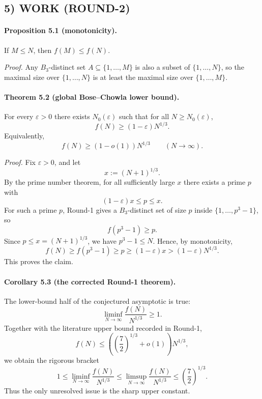 \subsection*{5) WORK (ROUND-2)}

\paragraph{Proposition 5.1 (monotonicity).}
If $M\le N$, then $f(M)\le f(N)$.

\emph{Proof.}
Any $B_3$-distinct set $A\subseteq\{1,\dots,M\}$ is also a subset of $\{1,\dots,N\}$, so the maximal size over $\{1,\dots,N\}$ is at least the maximal size over $\{1,\dots,M\}$.

\paragraph{Theorem 5.2 (global Bose--Chowla lower bound).}
For every $\varepsilon>0$ there exists $N_0(\varepsilon)$ such that for all $N\ge N_0(\varepsilon)$,
\[
 f(N)\ge (1-\varepsilon)N^{1/3}.
\]
Equivalently,
\[
 f(N)\ge (1-o(1))N^{1/3}
 \qquad (N\to\infty).
\]

\emph{Proof.}
Fix $\varepsilon>0$, and let
\[
 x:=(N+1)^{1/3}.
\]
By the prime number theorem, for all sufficiently large $x$ there exists a prime $p$ with
\[
 (1-\varepsilon)x\le p\le x.
\]
For such a prime $p$, Round-1 gives a $B_3$-distinct set of size $p$ inside $\{1,\dots,p^3-1\}$, so
\[
 f(p^3-1)\ge p.
\]
Since $p\le x=(N+1)^{1/3}$, we have $p^3-1\le N$. Hence, by monotonicity,
\[
 f(N)\ge f(p^3-1)\ge p\ge (1-\varepsilon)x>(1-\varepsilon)N^{1/3}.
\]
This proves the claim.

\paragraph{Corollary 5.3 (the corrected Round-1 theorem).}
The lower-bound half of the conjectured asymptotic is true:
\[
 \liminf_{N\to\infty}\frac{f(N)}{N^{1/3}}\ge 1.
\]
Together with the literature upper bound recorded in Round-1,
\[
 f(N)\le \left(\left(\frac{7}{2}\right)^{1/3}+o(1)\right)N^{1/3},
\]
we obtain the rigorous bracket
\[
 1\le \liminf_{N\to\infty}\frac{f(N)}{N^{1/3}}
 \le \limsup_{N\to\infty}\frac{f(N)}{N^{1/3}}
 \le \left(\frac{7}{2}\right)^{1/3}.
\]
Thus the only unresolved issue is the sharp upper constant.

